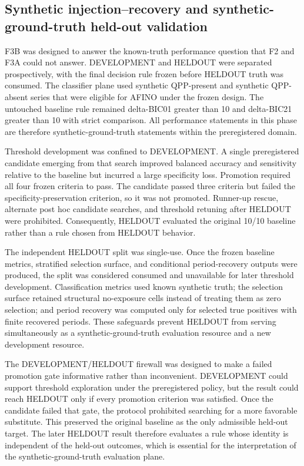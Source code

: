 \documentclass[11pt,a4paper]{article}
\begin{document}
\subsection{Synthetic injection--recovery and synthetic-ground-truth held-out validation}
F3B was designed to answer the known-truth performance question that F2 and F3A could not answer. DEVELOPMENT and HELDOUT were separated prospectively, with the final decision rule frozen before HELDOUT truth was consumed. The classifier plane used synthetic QPP-present and synthetic QPP-absent series that were eligible for AFINO under the frozen design. The untouched baseline rule remained delta-BIC01 greater than 10 and delta-BIC21 greater than 10 with strict comparison. All performance statements in this phase are therefore synthetic-ground-truth statements within the preregistered domain.

Threshold development was confined to DEVELOPMENT. A single preregistered candidate emerging from that search improved balanced accuracy and sensitivity relative to the baseline but incurred a large specificity loss. Promotion required all four frozen criteria to pass. The candidate passed three criteria but failed the specificity-preservation criterion, so it was not promoted. Runner-up rescue, alternate post hoc candidate searches, and threshold retuning after HELDOUT were prohibited. Consequently, HELDOUT evaluated the original 10/10 baseline rather than a rule chosen from HELDOUT behavior.

The independent HELDOUT split was single-use. Once the frozen baseline metrics, stratified selection surface, and conditional period-recovery outputs were produced, the split was considered consumed and unavailable for later threshold development. Classification metrics used known synthetic truth; the selection surface retained structural no-exposure cells instead of treating them as zero selection; and period recovery was computed only for selected true positives with finite recovered periods. These safeguards prevent HELDOUT from serving simultaneously as a synthetic-ground-truth evaluation resource and a new development resource.

The DEVELOPMENT/HELDOUT firewall was designed to make a failed promotion gate informative rather than inconvenient. DEVELOPMENT could support threshold exploration under the preregistered policy, but the result could reach HELDOUT only if every promotion criterion was satisfied. Once the candidate failed that gate, the protocol prohibited searching for a more favorable substitute. This preserved the original baseline as the only admissible held-out target. The later HELDOUT result therefore evaluates a rule whose identity is independent of the held-out outcomes, which is essential for the interpretation of the synthetic-ground-truth evaluation plane.
\end{document}
